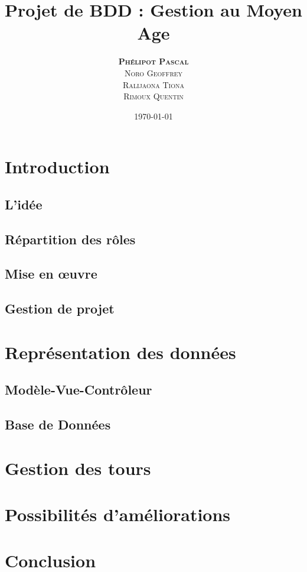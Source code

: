 \documentclass{beamer}
\author{\textsc{\textbf{Phélipot Pascal}}\\\textsc{Noro Geoffrey}\\\textsc{Ralijaona Tiona}\\\textsc{Rimoux Quentin}}
\title{Projet de BDD : Gestion au Moyen Age}
\date\today
\begin{document}
\begin{frame}
\maketitle
\end{frame}
\begin{frame}
\frametitle{\insertsection}
\tableofcontents
\end{frame}

\AtBeginSection{\frame{\sectionpage}}
\AtBeginSubsection{\frame{\subsectionpage}}

\section{Introduction}
\subsection{L'idée}

\subsection{Répartition des rôles}
\subsection{Mise en œuvre}
\subsection{Gestion de projet}


\newpage\section{Représentation des données}
\subsection{Modèle-Vue-Contrôleur}
\subsection{Base de Données}


\newpage\section{Gestion des tours}

\newpage\section{Possibilités d'améliorations}

\newpage\section{Conclusion}
\end{document}
